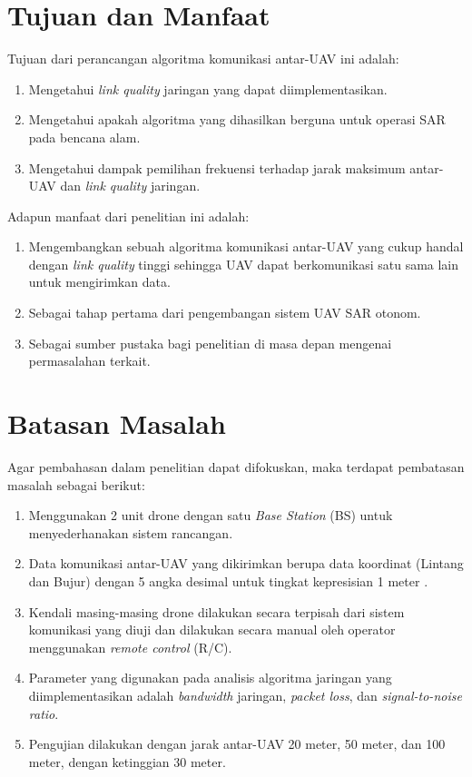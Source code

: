 \documentclass[main]{subfiles}
\begin{document}
\section{Tujuan dan Manfaat}
Tujuan dari perancangan algoritma komunikasi antar-UAV ini adalah:
\begin{enumerate}
	\item Mengetahui \textit{link quality} jaringan yang dapat diimplementasikan.
	\item Mengetahui apakah algoritma yang dihasilkan berguna untuk operasi SAR pada bencana alam.
	\item Mengetahui dampak pemilihan frekuensi terhadap jarak maksimum antar-UAV dan \textit{link quality} jaringan.
\end{enumerate}
Adapun manfaat dari penelitian ini adalah:
\begin{enumerate}
	\item Mengembangkan sebuah algoritma komunikasi antar-UAV yang cukup handal dengan \textit{link quality} tinggi sehingga UAV dapat berkomunikasi satu sama lain untuk mengirimkan data.
	\item Sebagai tahap pertama dari pengembangan sistem UAV SAR otonom.
	\item Sebagai sumber pustaka bagi penelitian di masa depan mengenai permasalahan terkait.
\end{enumerate}

\section{Batasan Masalah}
Agar pembahasan dalam penelitian dapat difokuskan, maka terdapat pembatasan masalah sebagai berikut:
\begin{enumerate}
	\item Menggunakan 2 unit drone dengan satu \textit{Base Station} (BS) untuk menyederhanakan sistem rancangan.
	\item Data komunikasi antar-UAV yang dikirimkan berupa data koordinat (Lintang dan Bujur) dengan 5 angka desimal untuk tingkat kepresisian 1 meter \cite{PrecisionCoordinatesOpenStreetMap}.
	\item Kendali masing-masing drone dilakukan secara terpisah dari sistem komunikasi yang diuji dan dilakukan secara manual oleh operator menggunakan \textit{remote control} (R/C).
	\item Parameter yang digunakan pada analisis algoritma jaringan yang diimplementasikan adalah \textit{bandwidth} jaringan, \textit{packet loss}, dan \textit{signal-to-noise ratio}.
	\item Pengujian dilakukan dengan jarak antar-UAV 20 meter, 50 meter, dan 100 meter, dengan ketinggian 30 meter.
\end{enumerate}
\end{document}
